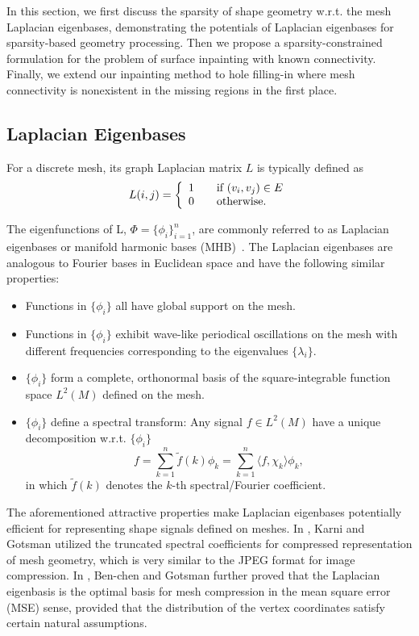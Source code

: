 In this section, we first discuss the sparsity of shape geometry
w.r.t. the mesh Laplacian eigenbases, demonstrating the potentials of
Laplacian eigenbases for sparsity-based geometry processing. Then we
propose a sparsity-constrained formulation for the problem of surface
inpainting with known connectivity. Finally, we extend our inpainting
method to hole filling-in where mesh connectivity is nonexistent in
the missing regions in the first place.

\subsection{Laplacian Eigenbases}

For a discrete mesh, its graph Laplacian matrix $L$ is typically
defined as
\begin{equation}
L(i,j) = \left\{
    \begin{array}{l l}
    1 & \quad \text{if $(v_i, v_j) \in E$} \\
    0 & \quad \text{otherwise.}
    \end{array}\right.
\end{equation}

The eigenfunctions of L, $\Phi = \{\phi_i\}_{i=1}^n$, are commonly
referred to as Laplacian eigenbases or manifold harmonic bases
(MHB)~\cite{Vallet2008}. The Laplacian eigenbases are analogous to
Fourier bases in Euclidean space and have the following similar
properties:
\begin{itemize}
\item Functions in $\{\phi_i\}$ all have global support on the mesh.
\item Functions in $\{\phi_i\}$ exhibit wave-like periodical
  oscillations on the mesh with different frequencies corresponding to
  the eigenvalues $\{\lambda_i\}$.
\item $\{\phi_i\}$ form a complete, orthonormal basis of the
  square-integrable function space $L^2(M)$ defined on the mesh.
\item $\{\phi_i\}$ define a spectral transform: Any signal $f\in
  L^2(M)$ have a unique decomposition w.r.t. $\{\phi_i\}$
      $$f=\sum_{k=1}^n \tilde{f}(k) \phi_k = \sum_{k=1}^n \langle f,\chi_k \rangle \phi_k,$$
      in which $\tilde{f}(k)$ denotes the $k$-th spectral/Fourier
      coefficient.
\end{itemize}

The aforementioned attractive properties make Laplacian eigenbases
potentially efficient for representing shape signals defined on
meshes. In \cite{Karni2000}, Karni and Gotsman utilized the truncated
spectral coefficients for compressed representation of mesh geometry, which
is very similar to the JPEG format for image compression.
In \cite{Ben-Chen2005}, Ben-chen and Gotsman further proved that the
Laplacian eigenbasis is the optimal basis for mesh compression in the
mean square error (MSE) sense, provided that the distribution of the
vertex coordinates satisfy certain natural assumptions.

